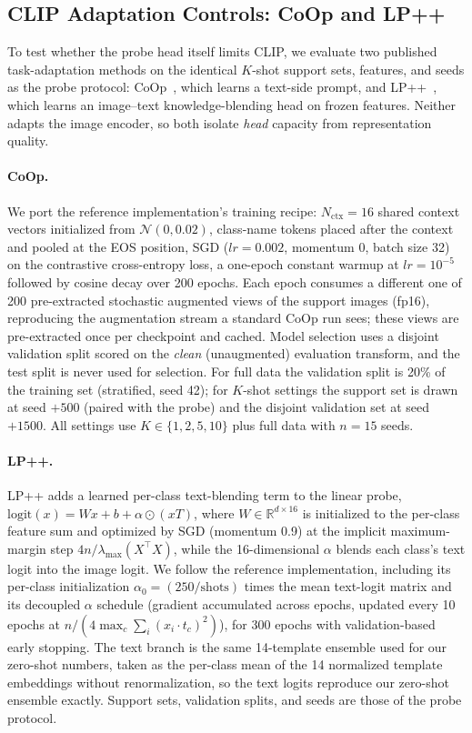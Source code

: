 \documentclass[10pt,a4paper]{article}
\begin{document}
\subsection{CLIP Adaptation Controls: CoOp and LP++}

To test whether the probe head itself limits CLIP, we evaluate two published task-adaptation methods on the identical $K$-shot support sets, features, and seeds as the probe protocol: CoOp~\cite{zhou2022learning}, which learns a text-side prompt, and LP++~\cite{lpplus}, which learns an image--text knowledge-blending head on frozen features. Neither adapts the image encoder, so both isolate \emph{head} capacity from representation quality.

\paragraph{CoOp.} We port the reference implementation's training recipe: $N_{\mathrm{ctx}}=16$ shared context vectors initialized from $\mathcal{N}(0,0.02)$, class-name tokens placed after the context and pooled at the EOS position, SGD ($lr=0.002$, momentum 0, batch size 32) on the contrastive cross-entropy loss, a one-epoch constant warmup at $lr=10^{-5}$ followed by cosine decay over 200 epochs. Each epoch consumes a different one of 200 pre-extracted stochastic augmented views of the support images (fp16), reproducing the augmentation stream a standard CoOp run sees; these views are pre-extracted once per checkpoint and cached. Model selection uses a disjoint validation split scored on the \emph{clean} (unaugmented) evaluation transform, and the test split is never used for selection. For full data the validation split is 20\% of the training set (stratified, seed 42); for $K$-shot settings the support set is drawn at seed $+500$ (paired with the probe) and the disjoint validation set at seed $+1500$. All settings use $K\in\{1,2,5,10\}$ plus full data with $n=15$ seeds.

\paragraph{LP++.} LP++ adds a learned per-class text-blending term to the linear probe, $\mathrm{logit}(x)=Wx+b+\alpha\odot(xT)$, where $W\in\mathbb{R}^{d\times16}$ is initialized to the per-class feature sum and optimized by SGD (momentum 0.9) at the implicit maximum-margin step $4n/\lambda_{\max}(X^\top X)$, while the 16-dimensional $\alpha$ blends each class's text logit into the image logit. We follow the reference implementation, including its per-class initialization $\alpha_0=(250/\text{shots})$ times the mean text-logit matrix and its decoupled $\alpha$ schedule (gradient accumulated across epochs, updated every 10 epochs at $n/(4\max_c\sum_i(x_i\!\cdot\!t_c)^2)$), for 300 epochs with validation-based early stopping. The text branch is the same 14-template ensemble used for our zero-shot numbers, taken as the per-class mean of the 14 normalized template embeddings without renormalization, so the text logits reproduce our zero-shot ensemble exactly. Support sets, validation splits, and seeds are those of the probe protocol.
\end{document}
